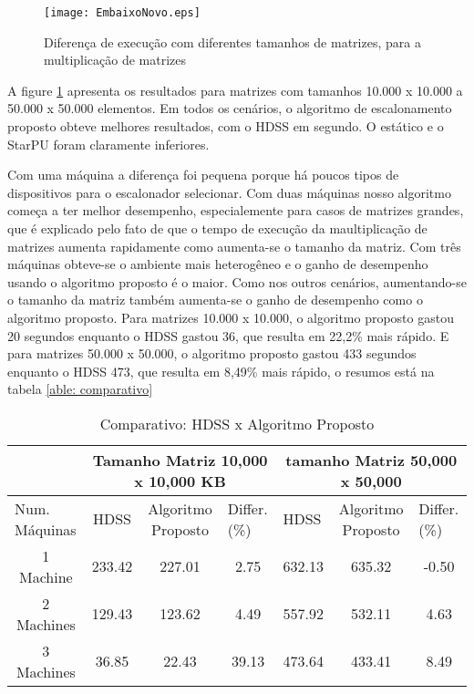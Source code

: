 \begin{figure}[htb]
	\begin{center}
	\centering
			\texttt{[image: EmbaixoNovo.eps]}
	\caption{Diferença de execução com diferentes tamanhos de matrizes, para a multiplicação de matrizes}
	\label{fig:todosJuntos}
	\end{center}
\end{figure}

A figure \ref{fig:todosJuntos} apresenta os resultados para matrizes com tamanhos 10.000 x 10.000 a 50.000 x 50.000 elementos. Em todos os cenários, o algoritmo de escalonamento proposto obteve melhores resultados, com o HDSS em segundo. O estático e o StarPU foram claramente inferiores.

Com uma máquina a diferença foi pequena porque há poucos tipos de dispositivos para o escalonador selecionar. Com duas máquinas nosso algoritmo começa a ter melhor desempenho, especialemente para casos de matrizes grandes, que é explicado pelo fato de que o tempo de execução da maultiplicação de matrizes aumenta rapidamente como aumenta-se o tamanho da matriz. Com três máquinas obteve-se o ambiente mais heterogêneo e o ganho de desempenho usando o algoritmo proposto é o maior. Como nos outros cenários, aumentando-se o tamanho da matriz também aumenta-se o ganho de desempenho como o algoritmo proposto. Para matrizes 10.000 x 10.000, o algoritmo proposto gastou 20 segundos enquanto o HDSS gastou 36, que resulta em 22,2\% mais rápido. E para matrizes 50.000 x 50.000, o algoritmo proposto gastou 433 segundos enquanto o HDSS 473, que resulta em 8,49\% mais rápido, o resumos está na tabela \ref{able: comparativo}

\begin{table}[h]
\centering
\tiny
\caption{Comparativo: HDSS x Algoritmo Proposto}

\begin{tabular}{c|c|c|c|c|c|c|}
\cline{2-7}
\multicolumn{1}{l|}{}                 & \multicolumn{3}{c|}{Tamanho Matriz 10,000 x 10,000 KB}                     & \multicolumn{3}{c|}{tamanho Matriz 50,000 x 50,000 }                                       \\ \hline
\multicolumn{1}{|l|}{Num. Máquinas} & HDSS   & Algoritmo Proposto& \multicolumn{1}{l|}{Differ. (\%)} & \multicolumn{1}{l|}{HDSS} & Algoritmo Proposto& \multicolumn{1}{l|}{Differ. (\%)} \\ \hline
\multicolumn{1}{|c|}{1 Machine}       & 233.42 & 227.01        & 2.75                                 & 632.13                    & 635.32        & -0.50                                \\ \hline
\multicolumn{1}{|c|}{2 Machines}      & 129.43 & 123.62        & 4.49                                 & 557.92                    & 532.11        & 4.63                                 \\ \hline
\multicolumn{1}{|c|}{3 Machines}      & 36.85  & 22.43         & 39.13                                & 473.64                    & 433.41        &            8.49                          \\ \hline
\end{tabular}
\label{table: comparativo}
\end{table}

